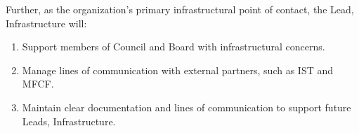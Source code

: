 Further, as the organization's primary infrastructural point of contact, 
the Lead, Infrastructure will:
\begin{enumerate}
    \item Support members of Council and Board with infrastructural concerns.
    \item Manage lines of communication with external partners, 
    such as IST and MFCF.
    \item Maintain clear documentation and lines of communication to support 
    future Leads, Infrastructure.
\end{enumerate}
